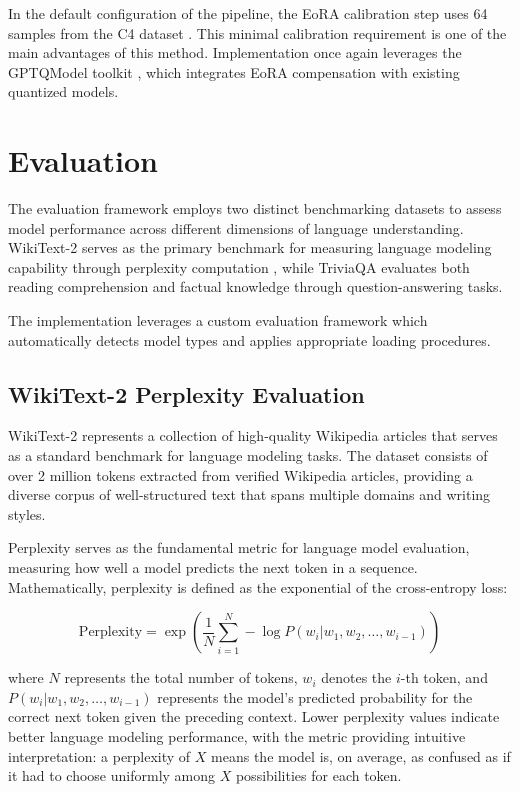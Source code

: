 In the default configuration of the pipeline, the EoRA calibration step uses 64 samples from the C4 dataset \cite{c4}. This minimal calibration requirement is one of the main advantages of this method. Implementation once again leverages the GPTQModel toolkit \cite{gptqmodel}, which integrates EoRA compensation with existing quantized models.


\section{Evaluation} \label{evaluation}

The evaluation framework employs two distinct benchmarking datasets to assess model performance across different dimensions of language understanding. WikiText-2 \cite{wikitext} serves as the primary benchmark for measuring language modeling capability through perplexity computation \cite{perplexity}, while TriviaQA \cite{triviaqa} evaluates both reading comprehension and factual knowledge through question-answering tasks.

The implementation leverages a custom evaluation framework which automatically detects model types and applies appropriate loading procedures.

\subsection{WikiText-2 Perplexity Evaluation}

WikiText-2 \cite{wikitext} represents a collection of high-quality Wikipedia articles that serves as a standard benchmark for language modeling tasks. The dataset consists of over 2 million tokens extracted from verified Wikipedia articles, providing a diverse corpus of well-structured text that spans multiple domains and writing styles.

Perplexity serves as the fundamental metric for language model evaluation, measuring how well a model predicts the next token in a sequence. Mathematically, perplexity is defined as the exponential of the cross-entropy loss:

\begin{equation}
\text{Perplexity} = \exp\left(\frac{1}{N} \sum_{i=1}^{N} -\log P(w_i | w_1, w_2, \ldots, w_{i-1})\right)
\end{equation}

where $N$ represents the total number of tokens, $w_i$ denotes the $i$-th token, and $P(w_i | w_1, w_2, \ldots, w_{i-1})$ represents the model's predicted probability for the correct next token given the preceding context.
Lower perplexity values indicate better language modeling performance, with the metric providing intuitive interpretation: a perplexity of $X$ means the model is, on average, as confused as if it had to choose uniformly among $X$ possibilities for each token.

